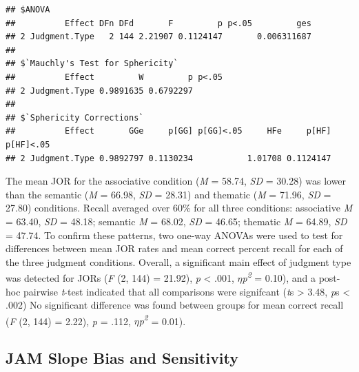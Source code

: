 \documentclass[english,,man]{apa6}
\begin{document}
\begin{verbatim}
## $ANOVA
##          Effect DFn DFd       F         p p<.05         ges
## 2 Judgment.Type   2 144 2.21907 0.1124147       0.006311687
## 
## $`Mauchly's Test for Sphericity`
##          Effect         W         p p<.05
## 2 Judgment.Type 0.9891635 0.6792297      
## 
## $`Sphericity Corrections`
##          Effect       GGe     p[GG] p[GG]<.05     HFe     p[HF] p[HF]<.05
## 2 Judgment.Type 0.9892797 0.1130234           1.01708 0.1124147
\end{verbatim}

The mean JOR for the associative condition (\emph{M} = 58.74, \emph{SD}
= 30.28) was lower than the semantic (\emph{M} = 66.98, \emph{SD} =
28.31) and thematic (\emph{M} = 71.96, \emph{SD} = 27.80) conditions.
Recall averaged over 60\% for all three conditions: associative \emph{M}
= 63.40, \emph{SD} = 48.18; semantic \emph{M} = 68.02, \emph{SD} =
46.65; thematic \emph{M} = 64.89, \emph{SD} = 47.74. To confirm these
patterns, two one-way ANOVAs were used to test for differences between
mean JOR rates and mean correct percent recall for each of the three
judgment conditions. Overall, a significant main effect of judgment type
was detected for JORs (\emph{F} (2, 144) = 21.92), \emph{p} \textless{}
.001, \(\eta\)\emph{p\textsuperscript{2}} = 0.10), and a post-hoc
pairwise \emph{t}-test indicated that all comparisons were signifcant
(\emph{t}s \textgreater{} 3.48, \emph{p}s \textless{} .002) No
significant difference was found between groups for mean correct recall
(\emph{F} (2, 144) = 2.22), \emph{p} = .112,
\(\eta\)\emph{p\textsuperscript{2}} = 0.01).

\subsection{JAM Slope Bias and
Sensitivity}\label{jam-slope-bias-and-sensitivity}
\end{document}
